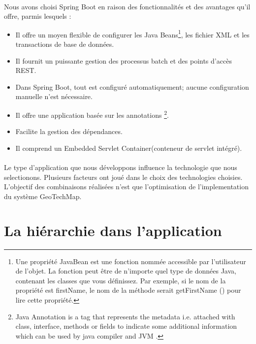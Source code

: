         \paragraph{}
        Nous avons choisi Spring Boot en raison des fonctionnalités et des avantages qu'il offre, parmis lesquels :
        \begin{itemize}
                \item Il offre un moyen flexible de configurer les Java Beans\footnote{
                        Une propriété JavaBean est une fonction nommée accessible par l'utilisateur de l'objet. 
                        La fonction peut être de n'importe quel type de données Java, contenant les classes que 
                        vous définissez. Par exemple, si le nom de la propriété est firstName, le nom de la méthode 
                        serait getFirstName () pour lire cette propriété.
                }, les
                 fichier XML et les transactions de base de données.
                \item Il fournit un puissante gestion des processus batch et des points d'accès REST.
                \item Dans Spring Boot, tout est configuré automatiquement; aucune configuration manuelle n'est nécessaire.
                \item Il offre une application basée sur les annotations \footnote{
                        Java Annotation is a tag that represents the metadata i.e. attached with class, interface, methods or fields to indicate 
                        some additional information which can be used by java compiler and JVM \cite{annotation}.
                }.
                \item Facilite la gestion des dépendances.
                \item Il comprend un Embedded Servlet Container(conteneur de servlet intégré).
        \end{itemize}
        \paragraph{}
        Le type d'application que nous développons influence la technologie que nous selectionons.
        Plusieurs facteurs ont joué dans le choix des technologies choisies. L'objectif des combinaisons
        réalisées n'est que l'optimisation de l'implementation du système GeoTechMap.
        \section{La hiérarchie dans l'application}
        \lipsum[1]

